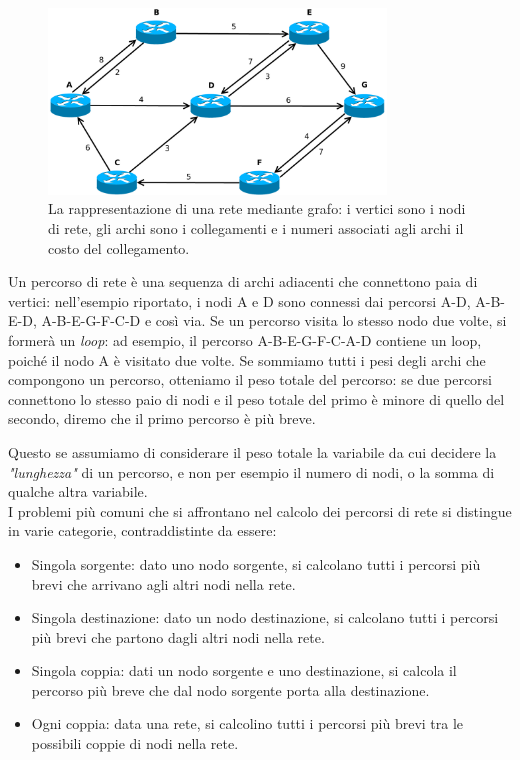 \documentclass[10pt,a4paper]{report}
\begin{document}
\begin{figure}[!hbp]
  \begin{center}
    \includegraphics[width=0.8\textwidth]{img/graph_example}
    \caption[]{La rappresentazione di una rete mediante grafo: i
      vertici sono i nodi di rete, gli archi sono i collegamenti e i
      numeri associati agli archi il costo del collegamento.}
  \end{center}
\end{figure}

Un percorso di rete è una sequenza di archi adiacenti che connettono
paia di vertici: nell'esempio riportato, i nodi A e D sono connessi
dai percorsi A-D, A-B-E-D, A-B-E-G-F-C-D e così via. Se un percorso
visita lo stesso nodo due volte, si formerà un \textit{loop}: ad
esempio, il percorso A-B-E-G-F-C-A-D contiene un loop, poiché il nodo
A è visitato due volte. Se sommiamo tutti i pesi degli archi che
compongono un percorso, otteniamo il peso totale del percorso: se due
percorsi connettono lo stesso paio di nodi e il peso totale del primo
è minore di quello del secondo, diremo che il primo percorso è più
breve. 

Questo se assumiamo di considerare il peso totale la variabile da cui
decidere la \textit{"lunghezza"} di un percorso, e non per esempio il
numero di nodi, o la somma di qualche altra variabile.\\
I problemi più comuni che si affrontano nel calcolo dei percorsi di
rete si distingue in varie categorie, contraddistinte da essere:

\begin{itemize}
\item Singola sorgente: dato uno nodo sorgente, si calcolano tutti i
  percorsi più brevi che arrivano agli altri nodi nella rete.
\item Singola destinazione: dato un nodo destinazione, si calcolano
  tutti i percorsi più brevi che partono dagli altri nodi nella rete.
\item Singola coppia: dati un nodo sorgente e uno destinazione, si
  calcola il percorso più breve che dal nodo sorgente porta alla
  destinazione.
\item Ogni coppia: data una rete, si calcolino tutti i percorsi più
  brevi tra le possibili coppie di nodi nella rete.
\end{itemize}
\end{document}
